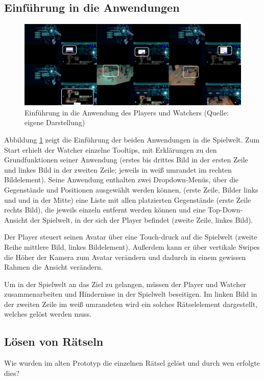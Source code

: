 \subsection{Einführung in die Anwendungen}

\begin{figure}[ht]
\centering
\includegraphics[width=1\linewidth]{content/pictures/Introduction.png}
\caption{Einführung in die Anwendung des Players und Watchers (Quelle: eigene Darstellung)}
\label{fig:old-introductions}
\end{figure}

Abbildung \ref{fig:old-introductions} zeigt die Einführung der beiden Anwendungen in die Spielwelt. Zum Start erhielt der Watcher einzelne Tooltips, mit Erklärungen zu den Grundfunktionen seiner Anwendung (erstes bis drittes Bild in der ersten Zeile und linkes Bild in der zweiten Zeile; jeweils in weiß umrandet im rechten Bildelement). Seine Anwendung enthalten zwei Dropdown-Menüs, über die Gegenstände und Positionen ausgewählt werden können, (erste Zeile, Bilder links und und in der Mitte) eine Liste mit allen platzierten Gegenstände (erste Zeile rechts Bild), die jeweils einzeln entfernt werden können und eine Top-Down-Ansicht der Spielwelt, in der sich der Player befindet (zweite Zeile, linkes Bild). 

Der Player steuert seinen Avatar über eine Touch-druck auf die Spielwelt (zweite Reihe mittlere Bild, linkes Bildelement). Außerdem kann er über vertikale Swipes die Höher der Kamera zum Avatar verändern und dadurch in einem gewissen Rahmen die Ansicht verändern.

Um in der Spielwelt an das Ziel zu gelangen, müssen der Player und Watcher zusammenarbeiten und Hindernisse in der Spielwelt beseitigen. Im linken Bild in der zweiten Zeile im weiß umrandeten wird ein solches Rätselelement dargestellt, welches gelöst werden muss.
\subsection{Lösen von Rätseln}
Wie wurden im alten Prototyp die einzelnen Rätsel gelöst und durch wen erfolgte dies?

